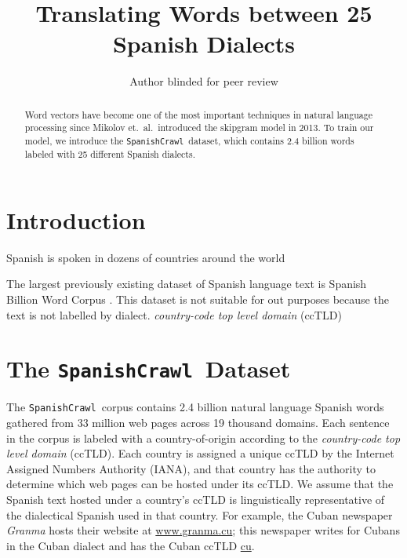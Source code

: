 \documentclass[runningheads]{llncs}
\newcommand{\escrawl}{\texttt{SpanishCrawl}}
\newcommand{\defn}[1]{\emph{#1}}
\begin{document}
\title{Translating Words between 25 Spanish Dialects}
%
%
\author{Author blinded for peer review}
%
%
%
\maketitle              %

\begin{abstract}
Word vectors have become one of the most important techniques in natural language processing since Mikolov et.\ al.\ introduced the skipgram model in 2013.
To train our model, we introduce the \escrawl\ dataset,
which contains 2.4 billion words labeled with 25 different Spanish dialects.

\end{abstract}


\section{Introduction}

Spanish is spoken in dozens of countries around the world

The largest previously existing dataset of Spanish language text is Spanish Billion Word Corpus \citep{cardellino2016billion}.
This dataset is not suitable for out purposes because the text is not labelled by dialect.
\defn{country-code top level domain} (ccTLD)


\section{The \escrawl~Dataset}

The \escrawl\ corpus contains 2.4 billion natural language Spanish words gathered from 33 million web pages across 19 thousand domains.
Each sentence in the corpus is labeled with a country-of-origin according to the \defn{country-code top level domain} (ccTLD).
Each country is assigned a unique ccTLD by the Internet Assigned Numbers Authority (IANA),
and that country has the authority to determine which web pages can be hosted under its ccTLD.
We assume that the Spanish text hosted under a country's ccTLD is linguistically representative of the dialectical Spanish used in that country.
For example, the Cuban newspaper \emph{Granma} hosts their website at \url{www.granma.cu};
this newspaper writes for Cubans in the Cuban dialect and has the Cuban ccTLD \url{cu}.
\end{document}
